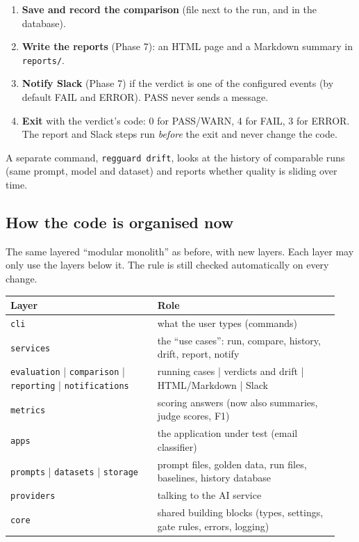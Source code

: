 \documentclass[11pt,a4paper]{article}
\newcommand{\code}[1]{\nolinkurl{#1}}
\begin{document}
\begin{enumerate}
\begin{itemize}
        \end{itemize}
  \item \textbf{Save and record the comparison} (file next to the run, and in the database).
  \item \textbf{Write the reports} (Phase 7): an HTML page and a Markdown summary in \code{reports/}.
  \item \textbf{Notify Slack} (Phase 7) if the verdict is one of the configured events (by
        default FAIL and ERROR). PASS never sends a message.
  \item \textbf{Exit} with the verdict's code: 0 for PASS/WARN, 4 for FAIL, 3 for ERROR. The
        report and Slack steps run \emph{before} the exit and never change the code.
\end{enumerate}
A separate command, \texttt{regguard drift}, looks at the history of comparable runs (same
prompt, model and dataset) and reports whether quality is sliding over time.

\subsection{How the code is organised now}

The same layered ``modular monolith'' as before, with new layers. Each layer may only use the
layers below it. The rule is still checked automatically on every change.

\begin{center}
\begin{tabular}{@{}p{0.42\linewidth}p{0.52\linewidth}@{}}
\toprule
\textbf{Layer} & \textbf{Role} \\
\midrule
\code{cli} & what the user types (commands) \\
\code{services} & the ``use cases'': run, compare, history, drift, report, notify \\
\code{evaluation} | \code{comparison} | \code{reporting} | \code{notifications} & running cases | verdicts and drift | HTML/Markdown | Slack \\
\code{metrics} & scoring answers (now also summaries, judge scores, F1) \\
\code{apps} & the application under test (email classifier) \\
\code{prompts} | \code{datasets} | \code{storage} & prompt files, golden data, run files, baselines, history database \\
\code{providers} & talking to the AI service \\
\code{core} & shared building blocks (types, settings, gate rules, errors, logging) \\
\bottomrule
\end{tabular}
\end{center}
\end{document}
